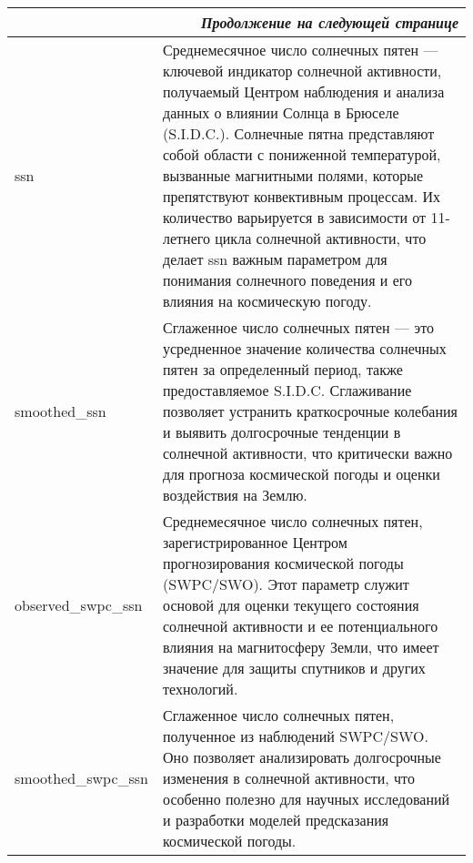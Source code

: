 \begin{longtable}{|l|p{12cm}|}
	\hline
	\multicolumn{2}{|r|}{\textit{Продолжение на следующей странице}}                                                                                                                                                                                                                                                                                                                                                                                                                                                                         \\
	\hline
	\endfoot

	\hline
	\endlastfoot

	ssn                   & Среднемесячное число солнечных пятен — ключевой индикатор солнечной активности, получаемый Центром наблюдения и анализа данных о влиянии Солнца в Брюселе (S.I.D.C.). Солнечные пятна представляют собой области с пониженной температурой, вызванные магнитными полями, которые препятствуют конвективным процессам. Их количество варьируется в зависимости от 11-летнего цикла солнечной активности, что делает ssn важным параметром для понимания солнечного поведения и его влияния на космическую погоду. \\
	\hline
	smoothed\_ssn         & Сглаженное число солнечных пятен — это усредненное значение количества солнечных пятен за определенный период, также предоставляемое S.I.D.C. Сглаживание позволяет устранить краткосрочные колебания и выявить долгосрочные тенденции в солнечной активности, что критически важно для прогноза космической погоды и оценки воздействия на Землю.                                                                                                                                                               \\
	\hline
	observed\_swpc\_ssn   & Среднемесячное число солнечных пятен, зарегистрированное Центром прогнозирования космической погоды (SWPC/SWO). Этот параметр служит основой для оценки текущего состояния солнечной активности и ее потенциального влияния на магнитосферу Земли, что имеет значение для защиты спутников и других технологий.                                                                                                                                                                                                  \\
	\hline
	smoothed\_swpc\_ssn   & Сглаженное число солнечных пятен, полученное из наблюдений SWPC/SWO. Оно позволяет анализировать долгосрочные изменения в солнечной активности, что особенно полезно для научных исследований и разработки моделей предсказания космической погоды.                                                                                                                                                                                                                                                              \\

\end{longtable}
